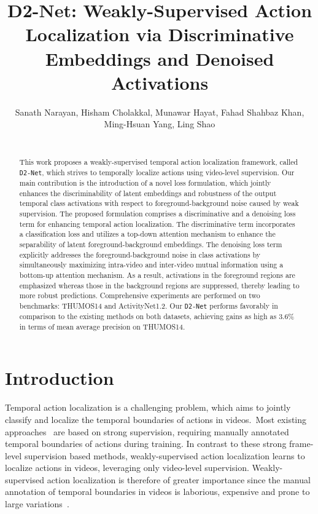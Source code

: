 \documentclass[final]{cvpr}
\title{D2-Net: Weakly-Supervised Action Localization
via Discriminative Embeddings and Denoised Activations}
\author{
Sanath Narayan\affmark[1], 
Hisham Cholakkal\affmark[2],  
Munawar Hayat\affmark[3], 
Fahad Shahbaz Khan\affmark[2], \\
Ming-Hsuan Yang\affmark[4,5], 
Ling Shao\affmark[1] \vspace{0.01cm}\\
\affaddr{\affmark[1]Inception Institute of Artificial Intelligence, UAE} \hspace{0.1cm}
\affaddr{\affmark[2]Mohamed bin Zayed University of AI, UAE} \\
\affaddr{\affmark[3]Monash University, Australia} \hspace{0.1cm}
\affaddr{\affmark[4]University of California, Merced, USA} \hspace{0.1cm}
\affaddr{\affmark[5]Google Research}

}
\def\proposed{\texttt{D2-Net}{}}
\begin{document}
\maketitle

\begin{abstract}

   This work proposes a weakly-supervised temporal action localization framework, called \proposed, which strives to temporally localize actions using video-level supervision. 
Our main contribution is the introduction of a novel loss formulation, which jointly enhances the discriminability of latent embeddings and robustness of the output temporal class activations with respect to foreground-background noise caused by weak supervision. 
The proposed formulation comprises a discriminative and a denoising loss term for enhancing temporal action localization. 
The discriminative term incorporates a classification loss and utilizes a top-down attention mechanism to enhance the separability of latent foreground-background embeddings. 
The denoising loss term explicitly addresses the foreground-background noise in class activations by simultaneously maximizing intra-video and inter-video mutual information using a bottom-up attention mechanism. As a result, activations in the foreground regions are emphasized whereas those in the background regions are suppressed, thereby leading to more robust predictions.
Comprehensive experiments are performed on two benchmarks: THUMOS14 and ActivityNet1.2. 
Our \proposed{} performs favorably in comparison to the existing methods on both datasets, achieving gains as high as  3.6\% in terms of mean average precision on THUMOS14.

      
\end{abstract}




\section{Introduction\label{sec:introduction}}

Temporal action localization is a challenging problem, which aims to jointly classify and localize the temporal boundaries of actions in videos.~Most existing approaches~\cite{gtad,talnet,rc3d,cdc,ssn,scnn} are based on strong supervision, requiring manually annotated temporal boundaries of actions during training.
In contrast to these strong frame-level supervision based methods, weakly-supervised action localization learns to localize actions in videos, leveraging only video-level supervision.
Weakly-supervised action localization is therefore of greater importance since the manual annotation of temporal boundaries in videos is laborious, expensive and prone to large variations~\cite{action-snippet,action-extent}. 
\end{document}
